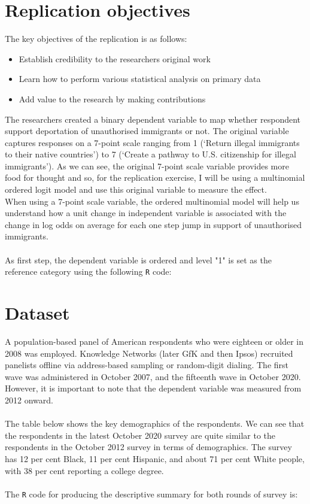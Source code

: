 \documentclass[12pt,letterpaper]{article}
\begin{document}
\section*{Replication objectives}
The key objectives of the replication is as follows:
\begin{itemize}
	\item Establish credibility to the researchers original work
	\item Learn how to perform various statistical analysis on primary data
	\item Add value to the research by making contributions
\end{itemize}
The researchers created a binary dependent variable to map whether respondent support deportation of unauthorised immigrants or not. The original variable captures responses on a 7-point scale ranging from 1 (‘Return illegal immigrants to their native countries’) to 7 (‘Create a pathway to U.S. citizenship for illegal immigrants’). As we can see, the original 7-point scale variable provides more food for thought and so, for the replication exercise, I will be using a multinomial ordered logit model and use this original variable to measure the effect.\\
When using a 7-point scale variable, the ordered multinomial model will help us understand how a unit change in independent variable is associated with the change in log odds on average for each one step jump in support of unauthorised immigrants.\\
\\As first step, the dependent variable is ordered and level "1" is set as the reference category using the following \texttt{R} code:
  

\vspace*{.2cm}

\section*{Dataset}
A population-based panel of American respondents who were eighteen or older in 2008 was employed. Knowledge Networks (later GfK and then Ipsos) recruited panelists offline via address-based sampling or random-digit dialing. The first wave was administered in October 2007, and
the fifteenth wave in October 2020. However, it is important to note that the dependent variable was measured from 2012 onward.\\
\\The table below shows the key demographics of the respondents. We can see that the respondents in the latest October 2020 survey are quite similar to the respondents in the October 2012 survey in terms of demographics. The survey has 12 per cent Black, 11 per cent Hispanic, and about 71 per cent White people, with 38 per cent reporting a college degree.\\
\\The \texttt{R} code for producing the descriptive summary for both rounds of survey is:

\end{document}
